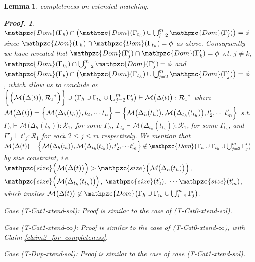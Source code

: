 \documentclass[12pt]{article}
\newtheorem{Lemma}{Lemma}[section]
\newtheorem{Proof}{Proof.}
\begin{document}
\begin{Lemma}{completeness on extended matching.}
\begin{Proof}
    $\mathpzc{Dom}(\Gamma_h) \cap \bigl(\mathpzc{Dom}(\Gamma_{t_h}) \cup
    \bigcup_{j=2}^m \mathpzc{Dom}(\Gamma'_j) \bigr) = \phi$ since
    $\mathpzc{Dom}(\Gamma_h) \cap \mathpzc{Dom}(\Gamma_{t_h}) = \phi$ as
    above. Consequently we have revealed that
    $\mathpzc{Dom}(\Gamma'_j) \cap \mathpzc{Dom}(\Gamma'_k) = \phi$ s.t.
    $j \neq k$,
    $\mathpzc{Dom}(\Gamma_{t_h}) \cap \bigcup_{j=2}^m \mathpzc{Dom}(
    \Gamma'_j) = \phi$ and
    $\mathpzc{Dom}(\Gamma_h) \cap \bigl(\mathpzc{Dom}(\Gamma_{t_h}) \cup
    \bigcup_{j=2}^m \mathpzc{Dom}(\Gamma'_j) \bigr) = \phi$, which
    allow us to conclude as
    $\biggl\{\Bigl(\mathcal{M}\bigl(\Delta(t) \bigr), {\mathcal{R}_1}^*
    \Bigr) \biggr\} \cup \bigl(\Gamma_h \cup \Gamma_{t_h} \cup
    \bigcup_{j=2}^m \Gamma'_j \bigr) \vdash
    \mathcal{M}\bigl(\Delta(t) \bigr) : {\mathcal{R}_1}^*$ where
    $\mathcal{M}\bigl(\Delta(t) \bigr) =
    \Bigl\{\mathcal{M}\bigl(\Delta_h(t_h) \bigr), t_2, \cdots t_n \Bigr\} =
    \Bigl\{\mathcal{M}\bigl(\Delta_h(t_h) \bigr),
    \mathcal{M}\bigl(\Delta_{t_h}(t_{t_h}) \bigr), t'_2, \cdots t'_m
    \Bigr\}$ s.t.
    $\Gamma_h \vdash \mathcal{M}\bigl(\Delta_h(t_h) \bigr) :
    \mathcal{R}_1$, for some $\Gamma_h$,
    $\Gamma_{t_h} \vdash \mathcal{M}\bigl(\Delta_{t_h}(t_{t_h}) \bigr) :
    \mathcal{R}_1$, for some $\Gamma_{t_h}$, and
    $\Gamma'_j \vdash t'_j : \mathcal{R}_1$ for each $2 \le j \le m$
    respectively. We mention that
    $\mathcal{M}\bigl(\Delta(t) \bigr) = \Bigl\{
    \mathcal{M}\bigl(\Delta_h(t_h) \bigr),
    \mathcal{M}\bigl(\Delta_{t_h}(t_{t_h}) \bigr), t'_2, \cdots t'_m
    \Bigr\} \not\in \mathpzc{Dom}\bigl(\Gamma_h \cup \Gamma_{t_h} \cup
    \bigcup_{j=2}^m \Gamma'_j \bigr)$ by size constraint, i.e.
    $\mathpzc{size}\Bigl(\mathcal{M}\bigl(\Delta(t) \bigr) \Bigr) >
    \mathpzc{size}\Bigl(\mathcal{M}\bigl(\Delta_h(t_h) \bigr) \Bigr)$,
    $\mathpzc{size}\Bigl(\mathcal{M}\bigl(\Delta_{t_h}(t_{t_h}) \bigr)
    \Bigr)$, $\mathpzc{size}(t'_2),\ \cdots \mathpzc{size}(t'_m)$, which
    implies $\mathcal{M}\bigl(\Delta(t) \bigr) \not\in \mathpzc{Dom}\bigl(
    \Gamma_h \cup \Gamma_{t_h} \cup \bigcup_{j=2}^m \Gamma'_j \bigr)$.
    
    Case (T-Cat1-xtend-sol):
    Proof is similar to the case of (T-Cat0-xtend-sol).
    
    Case (T-Cat1-xtend-$\infty$):
    Proof is similar to the case of (T-Cat0-xtend-$\infty$), with Claim
    \ref{claim2_for_completeness}.
    
    Case (T-Dup-xtend-sol):
    Proof is similar to the case of case (T-Cat1-xtend-sol).
    

\end{Proof}
\end{Lemma}
\end{document}
